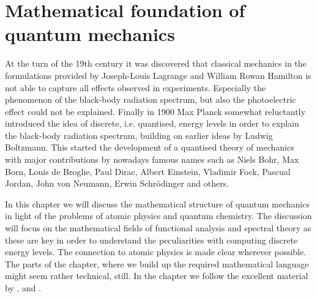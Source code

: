 \chapter{Mathematical foundation of quantum mechanics}
\label{ch:QM}


\noindent
At the turn of the 19th century it was discovered
that classical mechanics in the formulations provided
by Joseph-Louis Lagrange and William Rowan Hamilton
is not able to capture all effects observed in experiments.
Especially the phenomenon of the black-body radiation spectrum,
but also the photoelectric effect could not be explained.
Finally in 1900 Max Planck somewhat reluctantly introduced the idea of discrete,
i.e. quantised, energy levels
in order to explain the black-body radiation spectrum,
building on earlier ideas by Ludwig Boltzmann.
This started the development of a quantised theory of mechanics
with major contributions by nowadays famous names such as
Niels Bohr, Max Born, Louis de Broglie, Paul Dirac, Albert Einstein,
Vladimir Fock, Pascual Jordan, John von Neumann, Erwin Schrödinger
and others.

In this chapter we will discuss the mathematical structure
of quantum mechanics in light of the problems of atomic physics
and quantum chemistry.
The discussion will focus on the mathematical fields of functional
analysis and spectral theory as these are key in order
to understand the peculiarities with computing discrete energy levels.
The connection to atomic physics is made clear wherever possible.
The parts of the chapter, where we build up the required
mathematical language might seem rather technical, still.
In the chapter we follow the excellent material by \citet{Shankar1994},
\citet{Mueller2000} and \citet{Helffer2013}.





